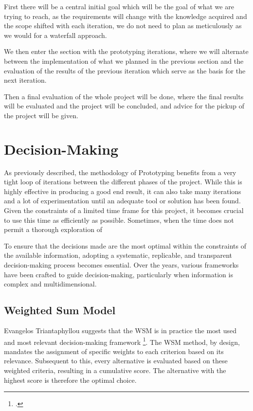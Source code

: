 First there will be a central initial goal which will be the goal of what we are trying to reach,
as the requirements will change with the knowledge acquired and the scope shifted with each iteration,
we do not need to plan as meticulously as we would for a waterfall approach.

We then enter the section with the prototyping iterations, 
where we will alternate between the implementation of what we planned in the previous section and
the evaluation of the results of the previous iteration which serve as the basis for the next iteration.
 
Then a final evaluation of the whole project will be done, where the final results will be evaluated and the project will be concluded,
and advice for the pickup of the project will be given.

\section{Decision-Making}
\label{decision_making}

As previously described, the methodology of Prototyping benefits from a very tight loop of iterations between the different phases of the project.
While this is highly effective in producing a good end result, it can also take many iterations and a lot of experimentation until an adequate tool or solution has been found.
Given the constraints of a limited time frame for this project, it becomes crucial to use this time as efficiently as possible.
Sometimes, when the time does not permit a thorough exploration of 

To ensure that the decisions made are the most optimal within the constraints of the available information, adopting a systematic, replicable, and transparent decision-making process becomes essential. Over the years, various frameworks have been crafted to guide decision-making, 
particularly when information is complex and multidimensional.

\subsection{Weighted Sum Model}
Evangelos Triantaphyllou suggests that the \ac{WSM} is in practice the most used and most relevant decision-making framework \footcite[p. 1]{triantaphyllouIntroductionMultiCriteriaDecision2000}.
The \ac{WSM} method, by design, mandates the assignment of specific weights to each criterion based on its relevance. Subsequent to this, every alternative is evaluated based on these weighted criteria, resulting in a cumulative score.
The alternative with the highest score is therefore the optimal choice.



